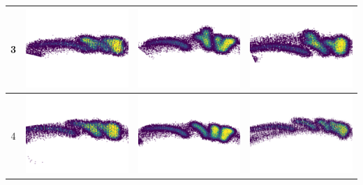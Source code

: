 \begin{table}[h]
\begin{tabular}{|c|c|c|c|}
\hline
3 & \includegraphics[scale=0.4]{images/m13.png} & \includegraphics[scale=0.4]{images/m23.png} & \includegraphics[scale=0.4]{images/m33.png} \\
\hline
4 & \includegraphics[scale=0.4]{images/m14.png} & \includegraphics[scale=0.4]{images/m24.png} & \includegraphics[scale=0.4]{images/m34.png}  \\

\end{tabular}
\end{table}
